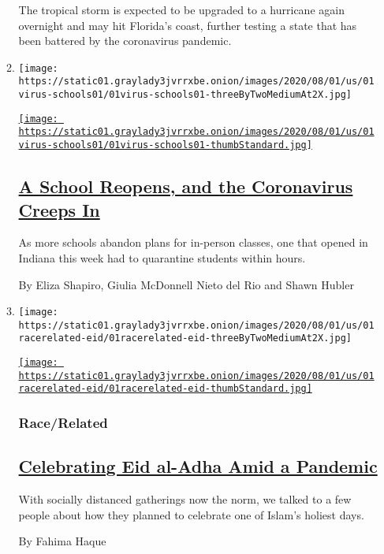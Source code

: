 \begin{enumerate}
\begin{enumerate}
    The tropical storm is expected to be upgraded to a hurricane again
    overnight and may hit Florida's coast, further testing a state that
    has been battered by the coronavirus pandemic.
  \item
    \texttt{[image: https://static01.graylady3jvrrxbe.onion/images/2020/08/01/us/01virus-schools01/01virus-schools01-threeByTwoMediumAt2X.jpg]}

    \href{/2020/08/01/us/schools-reopening-indiana-coronavirus.html}{\texttt{[image: https://static01.graylady3jvrrxbe.onion/images/2020/08/01/us/01virus-schools01/01virus-schools01-thumbStandard.jpg]}}

    \hypertarget{a-school-reopens-and-the-coronavirus-creeps-in}{%
    \subsection{\texorpdfstring{\href{/2020/08/01/us/schools-reopening-indiana-coronavirus.html}{A
    School Reopens, and the Coronavirus Creeps
    In}}{A School Reopens, and the Coronavirus Creeps In}}\label{a-school-reopens-and-the-coronavirus-creeps-in}}

    As more schools abandon plans for in-person classes, one that opened
    in Indiana this week had to quarantine students within hours.

    By Eliza Shapiro, Giulia McDonnell Nieto del Rio and Shawn Hubler
  \item
    \texttt{[image: https://static01.graylady3jvrrxbe.onion/images/2020/08/01/us/01racerelated-eid/01racerelated-eid-threeByTwoMediumAt2X.jpg]}

    \href{/2020/08/01/us/eid-al-adha-coronavirus.html}{\texttt{[image: https://static01.graylady3jvrrxbe.onion/images/2020/08/01/us/01racerelated-eid/01racerelated-eid-thumbStandard.jpg]}}

    \hypertarget{racerelated}{%
    \subsubsection{Race/Related}\label{racerelated}}

    \hypertarget{celebrating-eid-al-adha-amid-a-pandemic}{%
    \subsection{\texorpdfstring{\href{/2020/08/01/us/eid-al-adha-coronavirus.html}{Celebrating
    Eid al-Adha Amid a
    Pandemic}}{Celebrating Eid al-Adha Amid a Pandemic}}\label{celebrating-eid-al-adha-amid-a-pandemic}}

    With socially distanced gatherings now the norm, we talked to a few
    people about how they planned to celebrate one of Islam's holiest
    days.

    By Fahima Haque
  \end{enumerate}
\end{enumerate}

